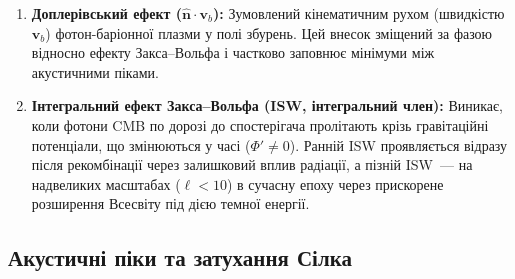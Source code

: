 \documentclass[12pt, a4paper]{article}
\begin{document}
\begin{enumerate}
        На суперхабблових масштабах у радіаційно-домінованій епосі
        рівняння збереження для фотонів і метричний потенціал $\Phi$
        пов'язані через рівняння Пуассона:
        $k^2\Phi \approx -4\pi G a^2 \bar\rho\,\delta$.
        У граничному випадку $k \to 0$ (масштаби значно більші за горизонт)
        розв'язок для адіабатичних початкових умов дає
        \cite{hu_sugiyama_1995}:
        \begin{equation*}
          \frac{1}{4}\delta_\gamma = -\frac{2}{3}\Phi,
        \end{equation*}
        де мінус означає, що надлишок густини фотонів ($\delta_\gamma > 0$)
        відповідає потенціальній ямі ($\Phi < 0$): плазма стиснута саме
        там, де є гравітаційний мінімум. Підставляючи у вираз для ефекту
        Закса--Вольфа:
        \begin{equation*}
          \frac{1}{4}\delta_\gamma + \Phi
          = -\frac{2}{3}\Phi + \Phi = \frac{1}{3}\Phi.
        \end{equation*}
        Знак «$+$»: фотони виходять з ями ($\Phi < 0$) і зазнають
        гравітаційного червоного зміщення, тобто виглядають
        \emph{холоднішими} (фотон витрачає свою енергію (частоту) на подолання гравітаційного потенціалу ями, «червоніє», і для зовнішнього спостерігача ця область космосу здається плямою зниженої температури.). Ефект $\frac{1}{3}\Phi < 0$ означає
        дефіцит температури у напрямку потенціальної ями~---
        саме це формує плато Закса--Вольфа на великих масштабах.
  \item \textbf{Доплерівський ефект ($\hat{\mathbf{n}} \cdot \mathbf{v}_b$):} Зумовлений кінематичним рухом (швидкістю $\mathbf{v}_b$) фотон-баріонної плазми у полі збурень. Цей внесок зміщений за фазою відносно ефекту Закса--Вольфа і частково заповнює мінімуми між акустичними піками.
  \item \textbf{Інтегральний ефект Закса--Вольфа (ISW, інтегральний член):} Виникає, коли фотони CMB по дорозі до спостерігача пролітають крізь гравітаційні потенціали, що змінюються у часі ($\Phi' \neq 0$). Ранній ISW проявляється відразу після рекомбінації через залишковий вплив радіації, а пізній ISW~--- на надвеликих масштабах ($\ell < 10$) в сучасну епоху через прискорене розширення Всесвіту під дією темної енергії.
\end{enumerate}

\subsection{Акустичні піки та затухання Сілка}
\end{document}
